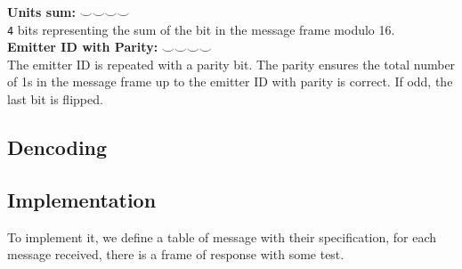 \documentclass[../main.tex]{subfiles}
\begin{document}
\textbf{Units sum:} $\smallsmile \smallsmile \smallsmile \smallsmile$\\
\texttt{4} bits representing the sum of the bit in the message frame modulo 16. \\ 

\textbf{Emitter ID with Parity:} $\smallsmile \smallsmile \smallsmile \smallsmile$\\
The emitter ID is repeated with a parity bit. The parity ensures the total number of 1s in the message frame up to the emitter ID with parity is correct. If odd, the last bit is flipped. \\



\subsection{Dencoding}


\subsection{Implementation}

To implement it, we define a table of message with their specification, for each message received, there is a frame of response with some test.
\end{document}
